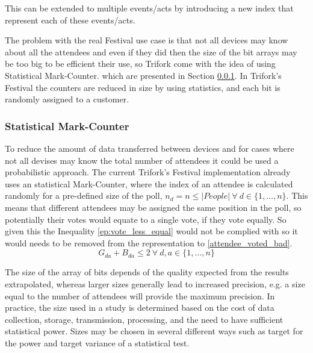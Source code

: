 This can be extended to multiple events/acts by introducing a new index that represent each of these events/acts.

The problem with the real Festival use case is that not all devices may know about all the attendees and even if they did then the size of the bit arrays may be too big to be efficient their use, so Trifork come with the idea of using Statistical Mark-Counter. which are presented in Section \ref{sec:stat_mark_counter}. In Trifork's Festival the counters are reduced in size by using statistics, and each bit is randomly assigned to a customer.

\subsubsection{Statistical Mark-Counter} \label{sec:stat_mark_counter}
To reduce the amount of data transferred between devices and for cases where not all devises may know the total number of attendees it could be used a probabilistic approach. The current Trifork's Festival implementation already uses an statistical Mark-Counter, where the index of an attendee is calculated randomly for a pre-defined size of the poll, $n_{d} = n \le |People| ~ \forall ~ d \in \{1,\dots, n\}$. This means that different attendees may be assigned the same position in the poll, so potentially their votes would equate to a single vote, if they vote equally. So given this the Inequality \ref{ep:vote_less_equal} would not be complied with so it would needs to be removed from the representation to \ref{attendee_voted_bad}.
\begin{equation} \label{ep:vote_less_equal}
	G_{da} + B_{da} \le 2 ~ \forall ~ d, a \in \{1,\dots, n\}
\end{equation}

The size of the array of bits depends of the quality expected from the results extrapolated, whereas larger sizes generally lead to increased precision, e.g. a size equal to the number of attendees will provide the maximum precision. In practice, the size used in a study is determined based on the cost of data collection, storage, transmission, processing, and the need to have sufficient statistical power. Sizes may be chosen in several different ways such as target for the power and target variance of a statistical test.
